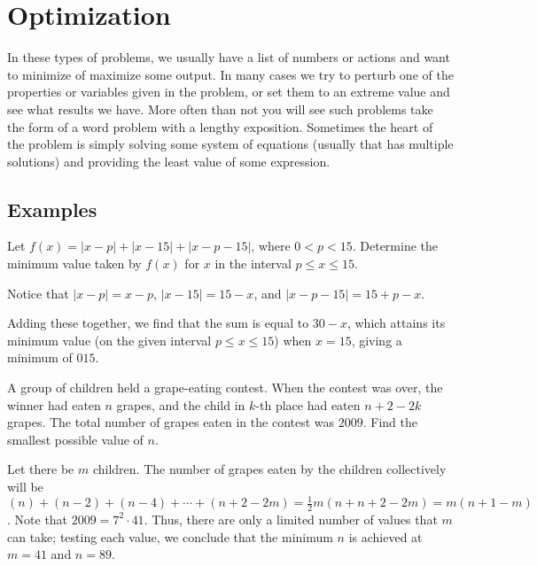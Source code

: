 \documentclass[blue,onecol]{shooting}
\begin{document}
\section{Optimization}

In these types of problems, we usually have a list of numbers or actions and want to minimize of maximize some output. In many cases we try to perturb one of the properties or variables given in the problem, or set them to an extreme value and see what results we have. More often than not you will see such problems take the form of a word problem with a lengthy exposition. Sometimes the heart of the problem is simply solving some system of equations (usually that has multiple solutions) and providing the least value of some expression.  

\subsection{Examples}
\begin{exam}[AIME 1983/2]
Let $f(x)=|x-p|+|x-15|+|x-p-15|$, where $0<p<15$. Determine the minimum value taken by $f(x)$ for $x$ in the interval $p\le x\le 15$. 
\end{exam}
\begin{sol}
Notice that $|x-p|=x-p$, $|x-15|=15-x$, and $|x-p-15|=15+p-x$.

Adding these together, we find that the sum is equal to $30-x$, which attains its minimum value (on the given interval $p \leq x \leq 15$) when $x=15$, giving a minimum of $\boxed{015}$.
\end{sol}

\begin{exam}[AIME II 2009/4]
A group of children held a grape-eating contest. When the contest was over, the winner had eaten $n$ grapes, and the child in $k$-th place had eaten $n+2-2k$ grapes. The total number of grapes eaten in the contest was $2009$. Find the smallest possible value of $n$.
\end{exam}
\begin{sol}
Let there be $m$ children. The number of grapes eaten by the children collectively will be $(n)+(n-2)+(n-4)+\cdots+(n+2-2m)=\frac12m(n+n+2-2m)=m(n+1-m)$. Note that $2009=7^2\cdot 41$. Thus, there are only a limited number of values that $m$ can take; testing each value, we conclude that the minimum $n$ is achieved at $m=41$ and $n=89$. 
\end{sol}
\end{document}

